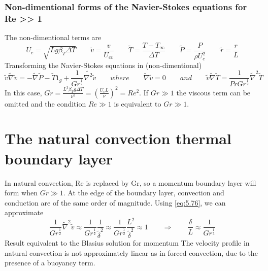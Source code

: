 	\subsubsection{Non-dimentional forms of the Navier-Stokes equations for Re >> 1}
	The non-dimentional terms are
	\begin{equation}
		U_{c} = \sqrt{L g \beta _T \Delta T} \qquad \tilde{v} = \frac{v}{U_{cv}} \qquad \tilde{T} = \frac{T-T_\infty}{\Delta T} \qquad \tilde{P} = \frac{P}{\rho U^2_c} \qquad \tilde{r} = \frac{r}{L}
	\end{equation}
	Transforming the Navier-Stokes equations in (non-dimentional)
	\begin{equation}
		\tilde{v} \tilde{\nabla} \tilde{v} = - \tilde{\nabla} \tilde{P} - \tilde{T} 1_g + \frac{1}{Gr ^{\frac{1}{2}}} \tilde{\nabla ^2} \tilde{v} \qquad where \qquad \tilde{\nabla} \tilde{v}= 0 \qquad and \qquad \tilde{v} \tilde{\nabla} \tilde{T} = \frac{1}{Pr Gr^{\frac{1}{2}}} \tilde{\nabla}^2 \tilde{T}
		\label{eq:5.76}
	\end{equation}
	In this case, $Gr = \frac{L^3\beta _T g \Delta T}{\nu ^2} = \left( \frac{U_c L}{\nu}\right) ^2= Re^2 $. If $Gr \gg 1$ the viscous term can be omitted and the condition $Re \gg 1$ is equivalent to $Gr \gg 1$.
	
	\section{The natural convection thermal boundary layer}
		In natural convection, Re is replaced by Gr, so a momentum boundary layer will form when $Gr \gg 1$. At the edge of the boundary layer, convection and conduction are of the same order of magnitude. Using \autoref{eq:5.76}, we can approximate
		\begin{equation}
			\frac{1}{Gr^{\frac{1}{2}}}\tilde{\nabla}^2 \tilde{v} \approx \frac{1}{Gr^{\frac{1}{2}}} \frac{1}{\tilde{\delta}^2} \approx \frac{1}{Gr^{\frac{1}{2}}} \frac{L^2}{\tilde{\delta}^2} \approx 1 \qquad \Rightarrow \qquad \frac{\delta}{L} \approx \frac{1}{Gr^{\frac{1}{4}}} 
		\end{equation}
		Result equivalent to the Blasius solution for momentum
    	The velocity profile in natural convection is not approximately linear as in forced convection, due to the presence of a buoyancy term. \\
    	
